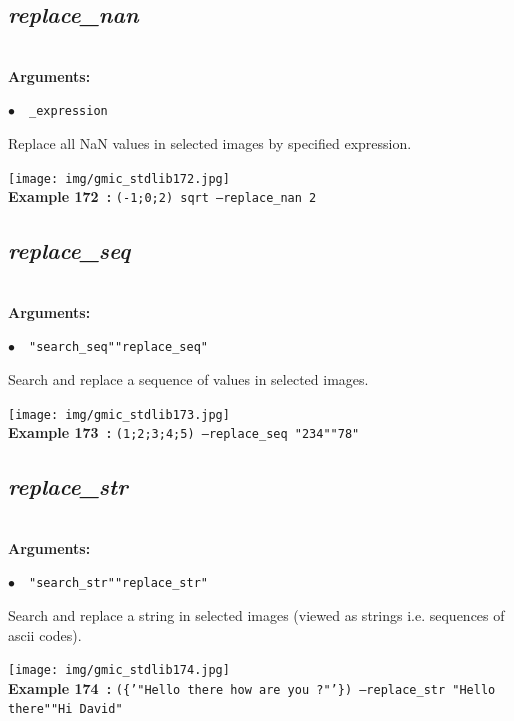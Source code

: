 \documentclass[a4paper,10.5pt,twoside]{book}
\def\comma{\discretionary{,}{}{,}}
\newcommand{\Cb}[1]{\textcolor{cb}{#1}}
\begin{document}
\subsection{\emph{replace\_nan} }\vspace*{-0.7em}
~\\\textbf{\Cb{Arguments: }}\begin{flushleft}
{\small \Cb{\hspace*{0.5cm}$\bullet$~~\texttt{\_expression}}}\end{flushleft}
Replace all NaN values in selected images by specified expression.
\begin{center}\texttt{[image: img/gmic\_stdlib172.jpg]}\\
{\footnotesize \textbf{Example 172~:} \texttt{(-1;0;2) sqrt --replace\_nan 2}}
\end{center}

\subsection{\emph{replace\_seq} }\vspace*{-0.7em}
~\\\textbf{\Cb{Arguments: }}\begin{flushleft}
{\small \Cb{\hspace*{0.5cm}$\bullet$~~\texttt{"search\_seq"{\comma}"replace\_seq"}}}\end{flushleft}
Search and replace a sequence of values in selected images.
\begin{center}\texttt{[image: img/gmic\_stdlib173.jpg]}\\
{\footnotesize \textbf{Example 173~:} \texttt{(1;2;3;4;5) --replace\_seq "2{\comma}3{\comma}4"{\comma}"7{\comma}8"}}
\end{center}

\subsection{\emph{replace\_str} }\vspace*{-0.7em}
~\\\textbf{\Cb{Arguments: }}\begin{flushleft}
{\small \Cb{\hspace*{0.5cm}$\bullet$~~\texttt{"search\_str"{\comma}"replace\_str"}}}\end{flushleft}
Search and replace a string in selected images (viewed as strings{\comma} i.e. sequences of ascii codes).
\begin{center}\texttt{[image: img/gmic\_stdlib174.jpg]}\\
{\footnotesize \textbf{Example 174~:} \texttt{(\{'"Hello there{\comma} how are you ?"'\}) --replace\_str "Hello there"{\comma}"Hi David"}}
\end{center}
\end{document}
